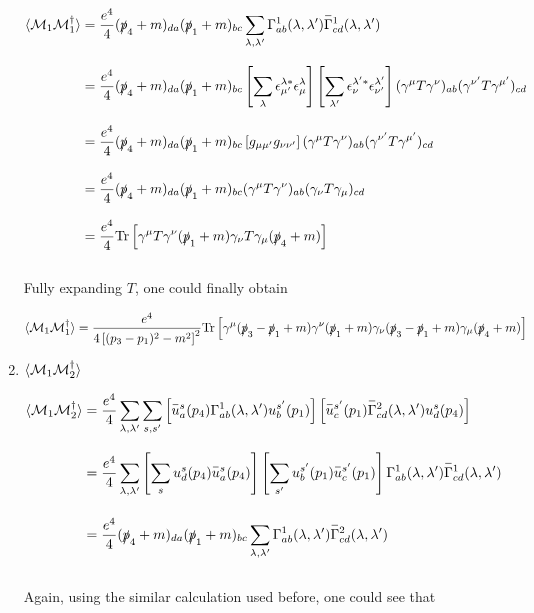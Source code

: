 \begin{solution}
\begin{enumerate}[label=(\alph*)]
    \begin{align*}
        \expval{\mathcal{M}_1\mathcal{M}_1^\dagger} &= \frac{e^4}{4}  (\pslash_4+m)_{da}  (\pslash_1+m)_{bc}  \sum_{\lambda,\lambda'} \Gamma^1_{ab}(\lambda,\lambda') \overbar{\Gamma}^1_{cd}(\lambda,\lambda') \\[0.12in]
        &= \frac{e^4}{4}  (\pslash_4+m)_{da}  (\pslash_1+m)_{bc} \left[ \sum_{\lambda}  \epsilon^{\lambda\ast}_{\mu'} \epsilon^\lambda_\mu \right] \left[ \sum_{\lambda'}  \epsilon^{\lambda' \ast}_\nu \epsilon^{\lambda'}_{\nu'} \right]  (\gamma^\mu T \gamma^\nu)_{ab} (\gamma^{\nu'} T \gamma^{\mu'})_{cd} \\[0.12in]
        &= \frac{e^4}{4}  (\pslash_4+m)_{da}  (\pslash_1+m)_{bc} \left[ g_{\mu\mu'} g_{\nu\nu'} \right](\gamma^\mu T \gamma^\nu)_{ab} (\gamma^{\nu'} T \gamma^{\mu'})_{cd}  \\[0.12in]
        &= \frac{e^4}{4}  (\pslash_4+m)_{da}  (\pslash_1+m)_{bc} (\gamma^\mu T \gamma^\nu)_{ab} (\gamma_{\nu} T \gamma_{\mu})_{cd}  \\[0.12in]
        &= \frac{e^4}{4} \tr \left[ \gamma^\mu T \gamma^\nu (\pslash_1+m) \gamma_{\nu} T \gamma_{\mu} (\pslash_4+m )\right] 
    \end{align*}\\
    Fully expanding $T$, one could finally obtain 

    \begin{align}
        \langle \mathcal{M}_1\mathcal{M}_1^\dagger \rangle = \frac{e^4}{4\left[(p_3-p_1)^2-m^2\right]^2} \text{Tr} \left[ \gamma^\mu (\slashed{p}_3-\slashed{p}_1 +m) \gamma^\nu (\slashed{p}_1 + m ) \gamma_\nu  (\slashed{p}_3-\slashed{p}_1 +m) \gamma_\mu (\slashed{p}_4 + m ) \right] \label{P6.12.a.1}
    \end{align}
    \item $\langle \mathcal{M}_1\mathcal{M}_2^\dagger \rangle $
    
    \begin{align}
        \expval{\mathcal{M}_1\mathcal{M}_2^\dagger} &= \frac{e^4}{4}  \sum_{\lambda,\lambda'} \sum_{s,s'} \left[  \overbar{u}^s_a(p_4) \Gamma^1_{ab}(\lambda,\lambda')u^{s'}_b(p_1)\right] \left[  \overbar{u}^{s'}_c(p_1)\overbar{\Gamma}^2_{cd}(\lambda,\lambda')u^{s}_d(p_4)\right] \nonumber \\[0.12in]
        &=  \frac{e^4}{4} \sum_{\lambda,\lambda'} \left[ \sum_{s} u^s_d(p_4) \overbar{u}^s_a(p_4) \right]  \left[ \sum_{s'}u^{s'}_b(p_1)   \overbar{u}^{s'}_c(p_1) \right] \Gamma^1_{ab}(\lambda,\lambda') \overbar{\Gamma}^1_{cd}(\lambda,\lambda') \nonumber \\[0.15in]
        &= \frac{e^4}{4}  (\pslash_4+m)_{da}  (\pslash_1+m)_{bc}  \sum_{\lambda,\lambda'} \Gamma^1_{ab}(\lambda,\lambda') \overbar{\Gamma}^2_{cd}(\lambda,\lambda')  \label{P6.12.b}
    \end{align}\\
    Again, using the similar calculation used before, one could see that
    

\end{enumerate}
\end{solution}
